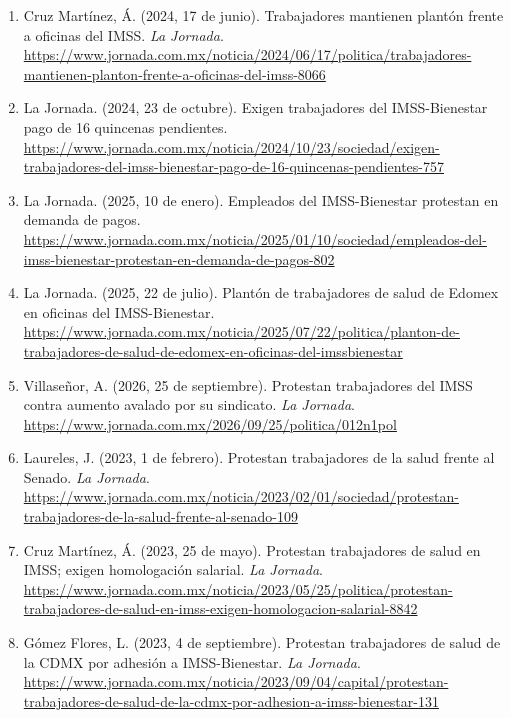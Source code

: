 \documentclass[12pt,letterpaper]{article}
\begin{document}
\begin{enumerate}[label=\arabic*.]
  \item Cruz Martínez, Á. (2024, 17 de junio). Trabajadores mantienen plantón frente a oficinas del IMSS. \textit{La Jornada}. \url{https://www.jornada.com.mx/noticia/2024/06/17/politica/trabajadores-mantienen-planton-frente-a-oficinas-del-imss-8066}

  \item La Jornada. (2024, 23 de octubre). Exigen trabajadores del IMSS-Bienestar pago de 16 quincenas pendientes. \url{https://www.jornada.com.mx/noticia/2024/10/23/sociedad/exigen-trabajadores-del-imss-bienestar-pago-de-16-quincenas-pendientes-757}

  \item La Jornada. (2025, 10 de enero). Empleados del IMSS-Bienestar protestan en demanda de pagos. \url{https://www.jornada.com.mx/noticia/2025/01/10/sociedad/empleados-del-imss-bienestar-protestan-en-demanda-de-pagos-802}

  \item La Jornada. (2025, 22 de julio). Plantón de trabajadores de salud de Edomex en oficinas del IMSS-Bienestar. \url{https://www.jornada.com.mx/noticia/2025/07/22/politica/planton-de-trabajadores-de-salud-de-edomex-en-oficinas-del-imssbienestar}

  \item Villaseñor, A. (2026, 25 de septiembre). Protestan trabajadores del IMSS contra aumento avalado por su sindicato. \textit{La Jornada}. \url{https://www.jornada.com.mx/2026/09/25/politica/012n1pol}

  \item Laureles, J. (2023, 1 de febrero). Protestan trabajadores de la salud frente al Senado. \textit{La Jornada}. \url{https://www.jornada.com.mx/noticia/2023/02/01/sociedad/protestan-trabajadores-de-la-salud-frente-al-senado-109}

  \item Cruz Martínez, Á. (2023, 25 de mayo). Protestan trabajadores de salud en IMSS; exigen homologación salarial. \textit{La Jornada}. \url{https://www.jornada.com.mx/noticia/2023/05/25/politica/protestan-trabajadores-de-salud-en-imss-exigen-homologacion-salarial-8842}

  \item Gómez Flores, L. (2023, 4 de septiembre). Protestan trabajadores de salud de la CDMX por adhesión a IMSS-Bienestar. \textit{La Jornada}. \url{https://www.jornada.com.mx/noticia/2023/09/04/capital/protestan-trabajadores-de-salud-de-la-cdmx-por-adhesion-a-imss-bienestar-131}
\end{enumerate}
\end{document}
